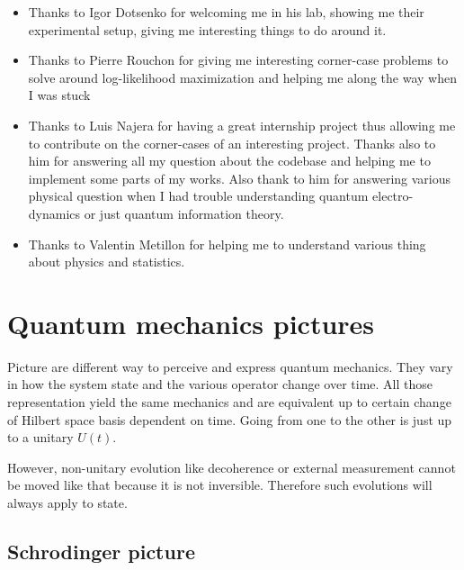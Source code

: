 \documentclass[10pt]{report}
\theoremstyle{plain}
\theoremstyle{definition}
\theoremstyle{remark}
\begin{document}
\begin{itemize}

\item Thanks to Igor Dotsenko for welcoming me in his lab, showing me their
  experimental setup, giving me interesting things to do around it.
\item Thanks to Pierre Rouchon for giving me interesting corner-case problems to solve
  around log-likelihood maximization and helping me along the way when I was stuck
\item Thanks to Luis Najera for having a great internship project thus allowing
  me to contribute on the corner-cases of an interesting project. Thanks also to
  him for answering all my question about the codebase and helping me to
  implement some parts of my works. Also thank to him for answering various
  physical question when I had trouble understanding quantum electro-dynamics or
  just quantum information theory.
\item Thanks to Valentin Metillon for helping me to understand various thing
  about physics and statistics.
\end{itemize}

\vfill






{\let\clearpage\relax }

\appendix

\chapter{Quantum mechanics pictures}\label{app:pict}

Picture are different way to perceive and express quantum mechanics. They vary
in how the system state and the various operator change over time. All those
representation yield the same mechanics and are equivalent up to certain change
of Hilbert space basis dependent on time. Going from one to the other is just up
to a unitary $U(t)$.

However, non-unitary evolution like decoherence or external measurement
cannot be moved like that because it is not inversible. Therefore such
evolutions will always apply to state.

\section{Schrodinger picture}
\end{document}
